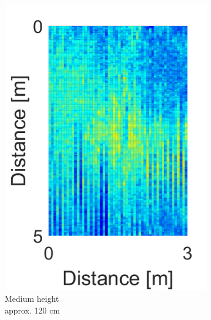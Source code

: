 \begin{minipage}{0.9\textwidth}
\begin{figure}[H]
\begin{subfigure}[b]{0.326\textwidth}
\includegraphics[width=\textwidth]{figures/Not_Norm_space_2.png}
\caption{Medium height \\ approx. 120 cm}
\label{Not_norm_medium}
\end{subfigure}
\begin{subfigure}[b]{0.326\textwidth}

\end{subfigure}
\end{figure}
\end{minipage}
